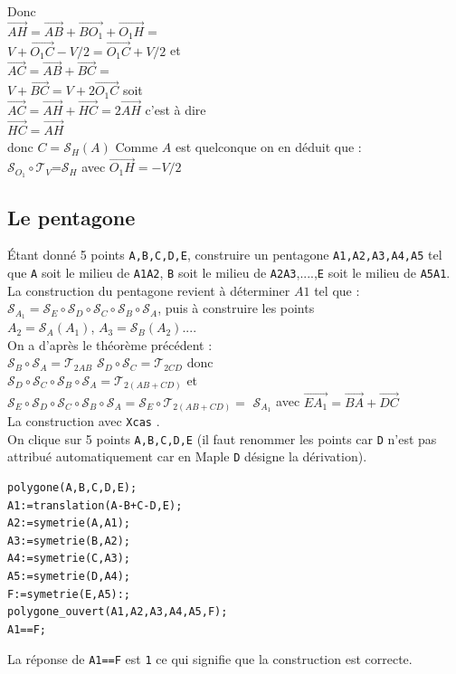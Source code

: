 \documentclass[a4paper,11pt]{book}
\begin{document}
\begin{enumerate}
Donc \\
$\overrightarrow {AH}=\overrightarrow {AB}+\overrightarrow {BO_1}+\overrightarrow {O_1H}=$\\
$V+\overrightarrow {O_1C}-V/2=\overrightarrow {O_1C}+V/2$ et\\
$\overrightarrow {AC}=\overrightarrow {AB}+\overrightarrow {BC}=$\\
$V+\overrightarrow {BC}=V+2\overrightarrow {O_1C}$ soit\\
$\overrightarrow {AC}=\overrightarrow {AH}+\overrightarrow {HC}=2\overrightarrow {AH}$ c'est \`a dire\\
$\overrightarrow {HC}=\overrightarrow {AH}$\\
donc $C=\mathcal S_H(A)$ 
Comme $A$ est quelconque on en d\'eduit que :\\
$\mathcal S_{O_1} \circ \mathcal T_{V}$=$\mathcal S_{H}$ avec
$\overrightarrow {O_1H}=-V/2$
\end{enumerate}
\subsection{Le pentagone}
\'Etant donn\'e 5 points {\tt A,B,C,D,E}, construire un pentagone 
 {\tt A1,A2,A3,A4,A5} tel que {\tt A} soit le milieu de {\tt A1A2},
{\tt B} soit le milieu de {\tt A2A3},....,{\tt E} soit le milieu de 
{\tt A5A1}.\\
La construction du pentagone revient \`a d\'eterminer $A1$ tel que :\\
$\mathcal S_{A_1}=\mathcal S_{E}\circ \mathcal S_{D}\circ \mathcal S_{C}\circ \mathcal S_{B}\circ \mathcal S_{A}$, puis \`a construire les points \\ 
$A_2=\mathcal S_{A}(A_1)$, $A_3=\mathcal S_{B}(A_2)...$.\\
On a d'apr\`es le th\'eor\`eme pr\'ec\'edent :\\
$\mathcal S_{B}\circ \mathcal S_{A}=\mathcal T_{2AB}$
$\mathcal S_{D}\circ \mathcal S_{C}=\mathcal T_{2CD}$
donc\\
$\mathcal S_{D}\circ \mathcal S_{C}\circ \mathcal S_{B}\circ \mathcal S_{A}=\mathcal T_{2(AB+CD)}$ et\\
$\mathcal S_{E}\circ \mathcal S_{D}\circ \mathcal S_{C}\circ \mathcal S_{B}\circ \mathcal S_{A}=\mathcal S_{E}\circ\mathcal T_{2(AB+CD)}=$
$\mathcal S_{A_1}$ avec $\overrightarrow {EA_1}=\overrightarrow {BA}+\overrightarrow {DC}$\\
La construction avec {\tt Xcas} .\\
On clique sur 5 points {\tt A,B,C,D,E} (il faut renommer les points car {\tt D}
n'est pas attribu\'e automatiquement car en Maple {\tt D} d\'esigne la 
d\'erivation). 
\begin{verbatim}
polygone(A,B,C,D,E);
A1:=translation(A-B+C-D,E);
A2:=symetrie(A,A1);
A3:=symetrie(B,A2);
A4:=symetrie(C,A3);
A5:=symetrie(D,A4);
F:=symetrie(E,A5):;
polygone_ouvert(A1,A2,A3,A4,A5,F);
A1==F;
\end{verbatim} 
La r\'eponse de {\tt A1==F} est {\tt 1} ce qui signifie que la construction est
correcte.
\end{document}
